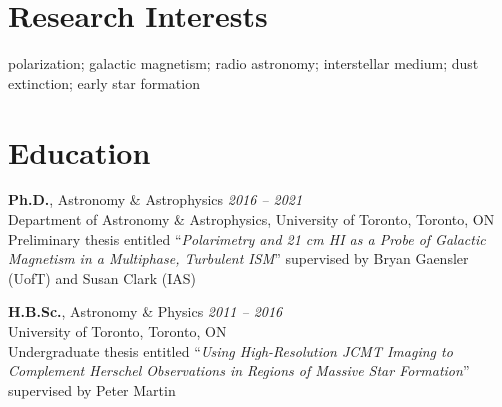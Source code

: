 \documentclass[10pt]{res} %
\begin{document}
\begin{resume}


\section{\Large Research Interests}
\vspace{-5pt} %
\noindent\makebox[\linewidth]{\rule{\textwidth}{0.4pt}}
\vspace{-20pt} %

polarization; galactic magnetism; radio astronomy; interstellar medium; dust extinction; early star formation


\section{\Large Education}
\vspace{-5pt} %
\noindent\makebox[\linewidth]{\rule{\textwidth}{0.4pt}}
\vspace{-20pt} %

{\bf Ph.D.}, Astronomy \& Astrophysics \hfill \textit{2016 -- 2021} \\
Department of Astronomy \& Astrophysics, University of Toronto, Toronto, ON \\
Preliminary thesis entitled ``\textit{Polarimetry and 21 cm HI as a Probe of Galactic Magnetism in a Multiphase, Turbulent ISM}'' supervised by Bryan Gaensler (UofT) and Susan Clark (IAS)

{\bf H.B.Sc.}, Astronomy \& Physics \hfill \textit{2011 -- 2016} \\ 
University of Toronto, Toronto, ON \\ 
Undergraduate thesis entitled ``\textit{Using High-Resolution JCMT Imaging to Complement Herschel Observations in Regions of Massive Star Formation}'' supervised by Peter Martin
 


\end{resume}
\end{document}

